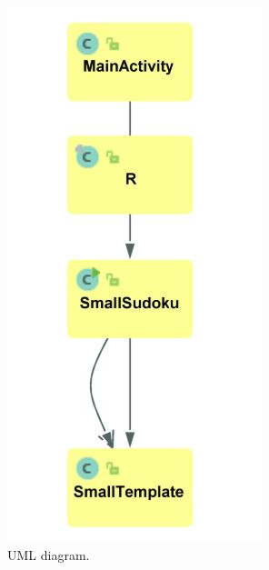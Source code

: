 \documentclass[a4paper,twoside,12pt]{book}
\begin{document}
\begin{figure}
\centering
  \includegraphics[width=\linewidth/2]{UML.jpg}
  \caption{UML diagram.}
  \label{fig:Diagram}
\end{figure}
\end{document}
